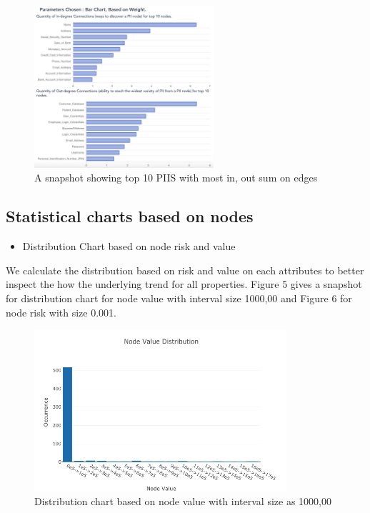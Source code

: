 \documentclass[letterpaper, 10 pt, conference]{ieeeconf}  %
\begin{document}
\begin{figure}[h!]
  \includegraphics[width=\linewidth, height=6cm]{pic4.png}
  \caption{A snapshot showing top 10 PIIS with most in, out sum on edges}
  \label{fig:pic2}
\end{figure}

\subsection{Statistical charts based on nodes}
\begin{itemize}
\item Distribution Chart based on node risk and value
\end{itemize}

We calculate the distribution based on risk and value on each attributes to better inspect the how the underlying trend for all properties. Figure 5 gives a snapshot for distribution chart for node value with interval size 1000,00 and  Figure 6 for node risk with size 0.001.

\begin{figure}[h!]
  \includegraphics[width=\linewidth, height=6cm]{node_value_distribution.png}
  \caption{Distribution chart based on node value with interval size as 1000,00}
  \label{fig:node_value_distribution}
\end{figure}
\end{document}
